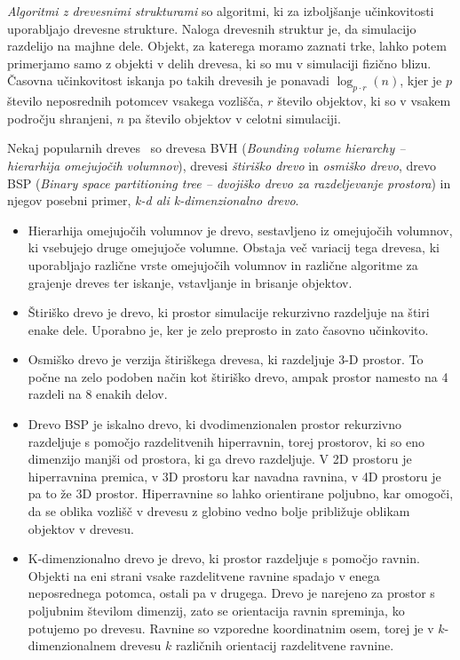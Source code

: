 \documentclass[a4paper,12pt]{article}
\begin{document}
\textit{Algoritmi z drevesnimi strukturami} so algoritmi, ki za izboljšanje učinkovitosti uporabljajo drevesne strukture.
Naloga drevesnih struktur je, da simulacijo razdelijo na majhne dele. Objekt, za katerega moramo zaznati trke,
lahko potem primerjamo samo z objekti v delih drevesa, ki so mu v simulaciji fizično blizu. Časovna učinkovitost 
iskanja po takih drevesih je ponavadi {\small$\log_{p \cdot r}(n)$}, kjer je $p$ število neposrednih potomcev vsakega vozlišča,
$r$ število objektov, ki so v vsakem področju shranjeni, $n$ pa število objektov v celotni simulaciji. 

Nekaj popularnih dreves~\cite{weller_brief_2013} so drevesa BVH (\textit{Bounding volume hierarchy -- hierarhija omejujočih volumnov}),
drevesi \textit{štiriško drevo} in \textit{osmiško drevo}, drevo BSP (\textit{Binary space partitioning tree -- dvojiško drevo za razdeljevanje prostora}) in njegov posebni primer, \textit{k-d ali k-di\-men\-zi\-o\-nal\-no drevo}. 

\begin{itemize}
    \item Hierarhija omejujočih volumnov je drevo, sestavljeno iz omejujočih volumnov, ki vsebujejo
    druge omejujoče volumne. Obstaja več variacij tega drevesa, ki uporabljajo različne vrste omejujočih volumnov
    in različne algoritme za grajenje dreves ter iskanje, vstavljanje in brisanje objektov.

    \item Štiriško drevo je drevo, ki prostor simulacije rekurzivno razdeljuje na štiri enake dele. Uporabno je,
    ker je zelo preprosto in zato časovno učinkovito.~\cite{re_analysis_1985}

    \item Osmiško drevo je verzija štiriškega drevesa, ki razdeljuje 3-D prostor. To počne na zelo podoben način kot štiriško drevo, ampak
    prostor namesto na 4 razdeli na 8 enakih delov.~\cite{schnabel_octree-based_2006}

    \item Drevo BSP je iskalno drevo, ki dvodimenzionalen prostor rekurzivno razdeljuje s pomočjo razdelitvenih hiperravnin,
    torej prostorov, ki so eno dimenzijo manjši od prostora, ki ga drevo razdeljuje. V 2D prostoru je hiperravnina premica,
    v 3D prostoru kar navadna ravnina, v 4D prostoru je pa to že 3D prostor. Hiperravnine so lahko orientirane
    poljubno, kar omogoči, da se oblika vozlišč v drevesu z globino vedno bolje približuje oblikam objektov v drevesu.~\cite{chin_iii5_1995}\cite{mehta_handbook_2018}

    \item K-dimenzionalno drevo je drevo, ki prostor razdeljuje s pomočjo ravnin. Objekti na eni strani vsake razdelitvene
    ravnine spadajo v enega neposrednega potomca, ostali pa v drugega. Drevo je narejeno za prostor s poljubnim številom dimenzij,
    zato se orientacija ravnin spreminja, ko potujemo po drevesu. Ravnine so vzporedne koordinatnim osem, torej je v
    $k$-dimenzionalnem drevesu $k$ različnih orientacij razdelitvene ravnine.~\cite{ramasubramanian_generalized_1989}
    
\end{itemize}
\end{document}
